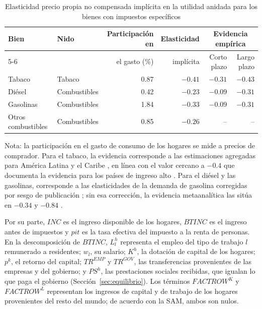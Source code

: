 \documentclass[11pt]{article}
\begin{document}
\begin{table}[H]
\centering
\caption{Elasticidad precio propia no compensada implícita en la utilidad anidada para los bienes con impuestos específicos}
\label{tab:util-elast}
\small
\begin{tabular}{|l|l|r|r|r|r|}
  \hline
  Bien & Nido & Participación en & Elasticidad & \multicolumn{2}{c|}{Evidencia empírica} \\
  \cline{5-6}
   & & el gasto (\%) & implícita & Corto plazo & Largo plazo \\
  \hline
  Tabaco & Tabaco & 0.87 & $-0.41$ & $-0.31$ & $-0.43$ \\
  \hline
  Diésel & Combustibles & 0.42 & $-0.23$ & $-0.09$ & $-0.31$ \\
  \hline
  Gasolinas & Combustibles & 1.84 & $-0.33$ & $-0.09$ & $-0.31$ \\
  \hline
  Otros combustibles & Combustibles & 0.85 & $-0.26$ & -- & -- \\
  \hline
\end{tabular}
\par\smallskip
\begin{minipage}{0.92\textwidth}
\footnotesize Nota: la participación en el gasto de consumo de los hogares se mide a precios de comprador. Para el tabaco, la evidencia corresponde a las estimaciones agregadas para América Latina y el Caribe \cite{guindon_etal_2016}, en línea con el valor cercano a $-0.4$ que documenta la evidencia para los países de ingreso alto \cite{iarc_2011}. Para el diésel y las gasolinas, corresponde a las elasticidades de la demanda de gasolina corregidas por sesgo de publicación \cite{havranek_etal_2012}; sin esa corrección, la evidencia metaanalítica las sitúa en $-0.34$ y $-0.84$ \cite{brons_etal_2008}.
\end{minipage}
\end{table}

Por su parte, $INC$ es el ingreso disponible de los hogares, $BTINC$ es el ingreso antes de impuestos y $pit$ es la tasa efectiva del impuesto a la renta de personas. En la descomposición de $BTINC$, $L^{h}_{l}$ representa el empleo del tipo de trabajo $l$ remunerado a residentes; $w_{l}$, su salario; $K^{h}$, la dotación de capital de los hogares; $p^{k}$, el retorno del capital; $TR^{EMP}$ y $TR^{GOV}$, las transferencias provenientes de las empresas y del gobierno; y $PS^{h}$, las prestaciones sociales recibidas, que igualan lo que paga el gobierno (Sección~\ref{sec:equilibrio}). Los términos $FACTROW^{K}$ y $FACTROW^{L}$ representan los ingresos de capital y de trabajo de los hogares provenientes del resto del mundo; de acuerdo con la SAM, ambos son nulos.
\end{document}
